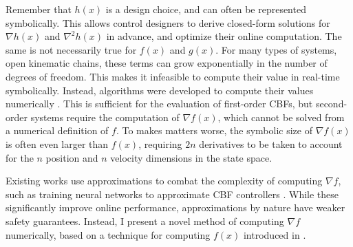 Remember that $h(x)$ is a design choice, and can often be represented symbolically. This allows control designers to derive closed-form solutions for $\nabla h(x)$ and $\nabla^2 h(x)$ in advance, and optimize their online computation. The same is not necessarily true for $f(x)$ and $g(x)$. For many types of systems, open kinematic chains, these terms can grow exponentially in the number of degrees of freedom. This makes it infeasible to compute their value in real-time symbolically. Instead, algorithms were developed to compute their values numerically \Cite{isenberg_2020, walker_orin_1982}. This is sufficient for the evaluation of first-order CBFs, but second-order systems require the computation of $\nabla f(x)$, which cannot be solved from a numerical definition of $f$. To makes matters worse, the symbolic size of $\nabla f(x)$ is often even larger than $f(x)$, requiring $2n$ derivatives to be taken to account for the $n$ position and $n$ velocity dimensions in the state space. \newline

Existing works use approximations to combat the complexity of computing $\nabla f$, such as training neural networks to approximate CBF controllers \Cite{Yaghoubi}. While these significantly improve online performance, approximations by nature have weaker safety guarantees. Instead, I present a novel method of computing $\nabla f$ numerically, based on a technique for computing $f(x)$ introduced in \Cite{isenberg_2020}.

